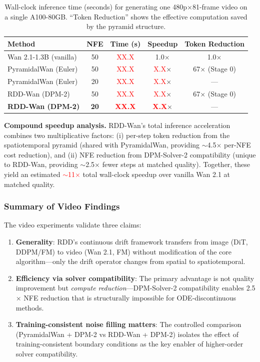 \documentclass[10pt]{article}
\begin{document}
\begin{table}[t]
\centering
\caption{Wall-clock inference time (seconds) for generating one 480p$\times$81-frame video on a single A100-80GB. ``Token Reduction'' shows the effective computation saved by the pyramid structure.}
\label{tab:video_speed}
\small
\begin{tabular}{@{}lcccc@{}}
\toprule
\textbf{Method} & \textbf{NFE} & \textbf{Time (s)} & \textbf{Speedup} & \textbf{Token Reduction} \\
\midrule
Wan 2.1-1.3B (vanilla) & 50 & \textcolor{red}{XX.X} & 1.0$\times$ & 1.0$\times$ \\
\midrule
PyramidalWan (Euler) & 50 & \textcolor{red}{XX.X} & \textcolor{red}{X.X}$\times$ & 67$\times$ (Stage 0) \\
PyramidalWan (Euler) & 20 & \textcolor{red}{XX.X} & \textcolor{red}{X.X}$\times$ & --- \\
\midrule
RDD-Wan (DPM-2) & 50 & \textcolor{red}{XX.X} & \textcolor{red}{X.X}$\times$ & 67$\times$ (Stage 0) \\
\textbf{RDD-Wan (DPM-2)} & \textbf{20} & \textcolor{red}{\textbf{XX.X}} & \textcolor{red}{\textbf{X.X}}$\times$ & --- \\
\bottomrule
\end{tabular}
\end{table}

\textbf{Compound speedup analysis.} RDD-Wan's total inference acceleration combines two multiplicative factors: (i) per-step token reduction from the spatiotemporal pyramid (shared with PyramidalWan, providing $\sim$4.5$\times$ per-NFE cost reduction), and (ii) NFE reduction from DPM-Solver-2 compatibility (unique to RDD-Wan, providing $\sim$2.5$\times$ fewer steps at matched quality). Together, these yield an estimated \textcolor{red}{$\sim$11$\times$} total wall-clock speedup over vanilla Wan 2.1 at matched quality.

\subsubsection{Summary of Video Findings}

The video experiments validate three claims:
\begin{enumerate}
    \item \textbf{Generality}: RDD's continuous drift framework transfers from image (DiT, DDPM/FM) to video (Wan 2.1, FM) without modification of the core algorithm---only the drift operator changes from spatial to spatiotemporal.
    \item \textbf{Efficiency via solver compatibility}: The primary advantage is not quality improvement but \emph{compute reduction}---DPM-Solver-2 compatibility enables 2.5$\times$ NFE reduction that is structurally impossible for ODE-discontinuous methods.
    \item \textbf{Training-consistent noise filling matters}: The controlled comparison (PyramidalWan + DPM-2 vs RDD-Wan + DPM-2) isolates the effect of training-consistent boundary conditions as the key enabler of higher-order solver compatibility.
\end{enumerate}
\end{document}
